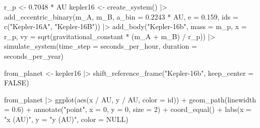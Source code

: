 \documentclass[
  10.5pt,
  letterpaper,
]{scrbook}
\newenvironment{Shaded}{\begin{snugshade}}{\end{snugshade}}
\newcommand{\AttributeTok}[1]{\textcolor[rgb]{0.00,0.00,0.00}{#1}}
\newcommand{\ConstantTok}[1]{\textcolor[rgb]{0.00,0.00,0.00}{#1}}
\newcommand{\DecValTok}[1]{\textcolor[rgb]{0.00,0.00,0.00}{#1}}
\newcommand{\FloatTok}[1]{\textcolor[rgb]{0.00,0.00,0.00}{#1}}
\newcommand{\FunctionTok}[1]{\textcolor[rgb]{0.00,0.00,0.00}{#1}}
\newcommand{\NormalTok}[1]{\textcolor[rgb]{0.00,0.00,0.00}{#1}}
\newcommand{\OtherTok}[1]{\textcolor[rgb]{0.00,0.00,0.00}{#1}}
\newcommand{\SpecialCharTok}[1]{\textcolor[rgb]{0.00,0.00,0.00}{#1}}
\newcommand{\StringTok}[1]{\textcolor[rgb]{0.00,0.00,0.00}{#1}}
\theoremstyle{definition}
\theoremstyle{plain}
\theoremstyle{remark}
\begin{document}
\begin{Shaded}
\begin{Highlighting}[]
\NormalTok{r\_p }\OtherTok{\textless{}{-}} \FloatTok{0.7048} \SpecialCharTok{*}\NormalTok{ AU}
\NormalTok{kepler16 }\OtherTok{\textless{}{-}} \FunctionTok{create\_system}\NormalTok{() }\SpecialCharTok{|\textgreater{}}
  \FunctionTok{add\_eccentric\_binary}\NormalTok{(m\_A, m\_B, }\AttributeTok{a\_bin =} \FloatTok{0.2243} \SpecialCharTok{*}\NormalTok{ AU, }\AttributeTok{e =} \FloatTok{0.159}\NormalTok{,}
                       \AttributeTok{ids =} \FunctionTok{c}\NormalTok{(}\StringTok{"Kepler{-}16A"}\NormalTok{, }\StringTok{"Kepler{-}16B"}\NormalTok{)) }\SpecialCharTok{|\textgreater{}}
  \FunctionTok{add\_body}\NormalTok{(}\StringTok{"Kepler{-}16b"}\NormalTok{, }\AttributeTok{mass =}\NormalTok{ m\_p, }\AttributeTok{x =}\NormalTok{ r\_p,}
           \AttributeTok{vy =} \FunctionTok{sqrt}\NormalTok{(gravitational\_constant }\SpecialCharTok{*}\NormalTok{ (m\_A }\SpecialCharTok{+}\NormalTok{ m\_B) }\SpecialCharTok{/}\NormalTok{ r\_p)) }\SpecialCharTok{|\textgreater{}}
  \FunctionTok{simulate\_system}\NormalTok{(}\AttributeTok{time\_step =}\NormalTok{ seconds\_per\_hour, }\AttributeTok{duration =}\NormalTok{ seconds\_per\_year)}

\NormalTok{from\_planet }\OtherTok{\textless{}{-}}\NormalTok{ kepler16 }\SpecialCharTok{|\textgreater{}}
  \FunctionTok{shift\_reference\_frame}\NormalTok{(}\StringTok{"Kepler{-}16b"}\NormalTok{, }\AttributeTok{keep\_center =} \ConstantTok{FALSE}\NormalTok{)}
\end{Highlighting}
\end{Shaded}

\begin{Shaded}
\begin{Highlighting}[]
\NormalTok{from\_planet }\SpecialCharTok{|\textgreater{}}
  \FunctionTok{ggplot}\NormalTok{(}\FunctionTok{aes}\NormalTok{(x }\SpecialCharTok{/}\NormalTok{ AU, y }\SpecialCharTok{/}\NormalTok{ AU, }\AttributeTok{color =}\NormalTok{ id)) }\SpecialCharTok{+}
  \FunctionTok{geom\_path}\NormalTok{(}\AttributeTok{linewidth =} \FloatTok{0.6}\NormalTok{) }\SpecialCharTok{+}
  \FunctionTok{annotate}\NormalTok{(}\StringTok{"point"}\NormalTok{, }\AttributeTok{x =} \DecValTok{0}\NormalTok{, }\AttributeTok{y =} \DecValTok{0}\NormalTok{, }\AttributeTok{size =} \DecValTok{2}\NormalTok{) }\SpecialCharTok{+}
  \FunctionTok{coord\_equal}\NormalTok{() }\SpecialCharTok{+}
  \FunctionTok{labs}\NormalTok{(}\AttributeTok{x =} \StringTok{"x (AU)"}\NormalTok{, }\AttributeTok{y =} \StringTok{"y (AU)"}\NormalTok{, }\AttributeTok{color =} \ConstantTok{NULL}\NormalTok{)}
\end{Highlighting}
\end{Shaded}
\end{document}
